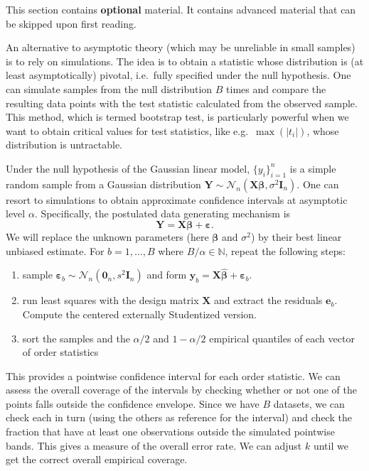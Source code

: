 \documentclass[]{book}
\theoremstyle{definition}
\theoremstyle{definition}
\theoremstyle{definition}
\theoremstyle{remark}
\begin{document}
This section contains \textbf{optional} material. It contains advanced
material that can be skipped upon first reading.

An alternative to asymptotic theory (which may be unreliable in small
samples) is to rely on simulations. The idea is to obtain a statistic
whose distribution is (at least asymptotically) pivotal, i.e.~fully
specified under the null hypothesis. One can simulate samples from the
null distribution \(B\) times and compare the resulting data points with
the test statistic calculated from the observed sample. This method,
which is termed bootstrap test, is particularly powerful when we want to
obtain critical values for test statistics, like e.g.~\(\max(|t_i|)\),
whose distribution is untractable.

Under the null hypothesis of the Gaussian linear model,
\(\{y_i\}_{i=1}^n\) is a simple random sample from a Gaussian
distribution
\(\boldsymbol{Y} \sim \mathcal{N}_n(\mathbf{X}\boldsymbol{\beta}, \sigma^2 \mathbf{I}_n)\).
One can resort to simulations to obtain approximate confidence intervals
at asymptotic level \(\alpha\). Specifically, the postulated data
generating mechanism is
\[\boldsymbol{Y} = \mathbf{X}\boldsymbol{\beta} + \boldsymbol{\varepsilon}.\]
We will replace the unknown parameters (here \(\boldsymbol{\beta}\) and
\(\sigma^2\)) by their best linear unbiased estimate. For
\(b=1, \ldots, B\) where \(B/\alpha \in \mathbb{N}\), repeat the
following steps:

\begin{enumerate}
\item sample $\boldsymbol{\varepsilon}_{b} \sim \mathcal{N}_n(\boldsymbol{0}_n, s^2\mathbf{I}_n)$ and form $\boldsymbol{y}_b = \mathbf{X} \hat{\boldsymbol{\beta}} + \boldsymbol{\varepsilon}_{b}$. 
\item run least squares with the design matrix $\mathbf{X}$ and extract the residuals $\boldsymbol{e}_b$. Compute 
the centered externally Studentized version.
\item sort the samples and the $\alpha/2$ and $1-\alpha/2$ empirical quantiles of each vector of order statistics
\end{enumerate}

This provides a pointwise confidence interval for each order statistic.
We can assess the overall coverage of the intervals by checking whether
or not one of the points falls outside the confidence envelope. Since we
have \(B\) datasets, we can check each in turn (using the others as
reference for the interval) and check the fraction that have at least
one observations outside the simulated pointwise bands. This gives a
measure of the overall error rate. We can adjust \(k\) until we get the
correct overall empirical coverage.
\end{document}
